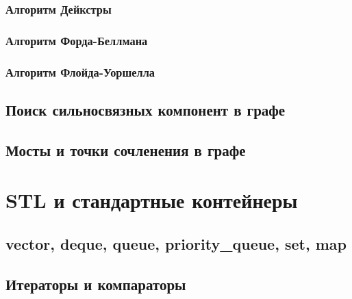 \documentclass[a4paper]{article}
\begin{document}
\subsubsection{Алгоритм Дейкстры}
\subsubsection{Алгоритм Форда-Беллмана}
\subsubsection{Алгоритм Флойда-Уоршелла}

\subsection{Поиск сильносвязных компонент в графе}
\subsection{Мосты и точки сочленения в графе}

\section{STL и стандартные контейнеры}
\subsection{vector, deque, queue, priority\_queue, set, map}
\subsection{Итераторы и компараторы}
\end{document}

